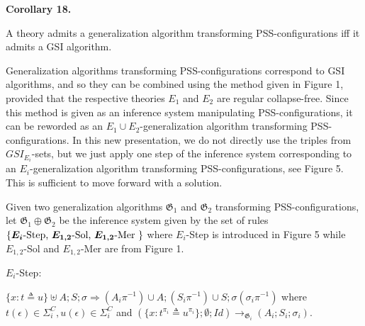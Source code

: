 \par\medskip\noindent\textbf{Corollary 18.}\par
 
 
A theory admits a generalization algorithm transforming PSS-configurations iff it admits a GSI algorithm.\par
 
 
 
 
Generalization algorithms transforming PSS-configurations correspond to GSI algorithms, and so they can be combined using the method given in Figure 1, provided that the respective theories $E_{1}$ and $E_{2}$ are regular collapse-free. Since this method is given as an inference system manipulating PSS-configurations, it can be reworded as an $E_{1}\cup E_{2}$-generalization algorithm transforming PSS-configurations. In this new presentation, we do not directly use the triples from $GSI_{E_{i}}$-sets, but we just apply one step of the inference system corresponding to an $E_{i}$-generalization algorithm transforming PSS-configurations, see Figure 5. This is sufficient to move forward with a solution.\par
 
 
 
Given two generalization algorithms $\mathfrak{G}_{1}$ and $\mathfrak{G}_{2}$ transforming PSS-configurations, let $\mathfrak{G}_{1}\oplus\mathfrak{G}_{2}$ be the inference system given by the set of rules $\{\text{{\boldmath$E_{i}$-Step}, {\boldmath$E_{1,2}$-Sol}, {\boldmath$E_{1,2}$-Mer}
}\}$ where $E_{i}$-Step is introduced in Figure 5 while $E_{1,2}$-Sol and $E_{1,2}$-Mer are from Figure 1.\par
 
 
  
\par
 
$E_{i}$-Step:\par
 
\par
 
$\{x:t\triangleq u\}\uplus A;S;\sigma\Longrightarrow(A_{i}\pi^{-1})\cup A;(S_{i}\pi^{-1})\cup S;\sigma(\sigma_{i}\pi^{-1})$ where $t(\epsilon)\in{\Sigma}^{C}_{i},u(\epsilon)\in{\Sigma}^{C}_{i}$ and $(\{x:t^{\pi_{i}}\triangleq u^{\pi_{i}}\};\emptyset;\mathit{Id})\longrightarrow_{\mathfrak{G}_{i}}(A_{i};S_{i};\sigma_{i})$.\par
  
